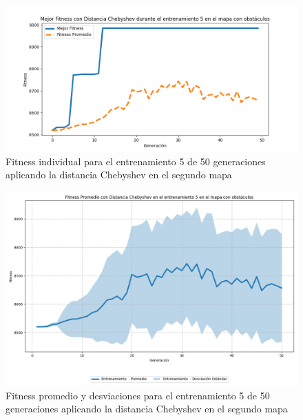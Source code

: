 \documentclass[lettersize, journal]{IEEEtran}
\begin{document}
\begin{figure}[H]
    \centering
    \includegraphics[width=0.9 \linewidth]{Chebyshev/Mapa2/Fitness_5_Map2_Cheby_50Gen.png}
    \caption{Fitness individual para el entrenamiento 5 de 50 generaciones aplicando la distancia Chebyshev en el segundo mapa}
    \label{fig:cheb_5_50_m2}
\end{figure}
\begin{figure}[H]
    \centering
    \includegraphics[width=0.9 \linewidth]{Chebyshev/Mapa2/Fitness_5_Map2_Cheby_50Gen_Sombra.png}
    \caption{Fitness promedio y desviaciones para el entrenamiento 5 de 50 generaciones aplicando la distancia Chebyshev en el segundo mapa}
    \label{fig:cheb_5_50_sombra_m2}
\end{figure}
\end{document}
